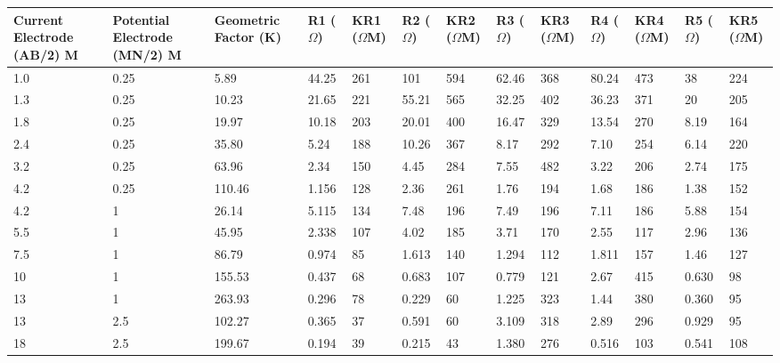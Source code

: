 \documentclass[12pt,a4paper]{report}
\begin{document}
\begin{table}[h!]
    \centering
    \begin{adjustbox}{max width=\textwidth}
    \renewcommand{\arraystretch}{1.5}
    \begin{tabular}{|p{2.5cm}|p{2.5cm}|p{2.5cm}|p{1.5cm}|p{1.8cm}|p{1.5cm}|p{1.8cm}|p{1.5cm}|p{1.8cm}|p{1.5cm}|p{1.8cm}|p{1.5cm}|p{1.8cm}|}
    \hline
    \textbf{Current Electrode (AB/2) M} & 
    \textbf{Potential Electrode (MN/2) M} & 
    \textbf{Geometric Factor (K)} & 
    \textbf{R1 ($\Omega$)} & 
    \textbf{KR1 ($\Omega$M)} & 
    \textbf{R2 ($\Omega$)} & 
    \textbf{KR2 ($\Omega$M)} & 
    \textbf{R3 ($\Omega$)} & 
    \textbf{KR3 ($\Omega$M)} & 
    \textbf{R4 ($\Omega$)} & 
    \textbf{KR4 ($\Omega$M)} & 
    \textbf{R5 ($\Omega$)} & 
    \textbf{KR5 ($\Omega$M)} \\ 
    \hline
    1.0 & 0.25 & 5.89 & 44.25 & 261 & 101 & 594 & 62.46 & 368 & 80.24 & 473 & 38 & 224 \\ \hline
    1.3 & 0.25 & 10.23 & 21.65 & 221 & 55.21 & 565 & 32.25 & 402 & 36.23 & 371 & 20 & 205 \\ \hline
    1.8 & 0.25 & 19.97 & 10.18 & 203 & 20.01 & 400 & 16.47 & 329 & 13.54 & 270 & 8.19 & 164 \\ \hline
    2.4 & 0.25 & 35.80 & 5.24 & 188 & 10.26 & 367 & 8.17 & 292 & 7.10 & 254 & 6.14 & 220 \\ \hline
    3.2 & 0.25 & 63.96 & 2.34 & 150 & 4.45 & 284 & 7.55 & 482 & 3.22 & 206 & 2.74 & 175 \\ \hline
    4.2 & 0.25 & 110.46 & 1.156 & 128 & 2.36 & 261 & 1.76 & 194 & 1.68 & 186 & 1.38 & 152 \\ \hline
    4.2 & 1 & 26.14 & 5.115 & 134 & 7.48 & 196 & 7.49 & 196 & 7.11 & 186 & 5.88 & 154 \\ \hline
    5.5 & 1 & 45.95 & 2.338 & 107 & 4.02 & 185 & 3.71 & 170 & 2.55 & 117 & 2.96 & 136 \\ \hline
    7.5 & 1 & 86.79 & 0.974 & 85 & 1.613 & 140 & 1.294 & 112 & 1.811 & 157 & 1.46 & 127 \\ \hline
    10 & 1 & 155.53 & 0.437 & 68 & 0.683 & 107 & 0.779 & 121 & 2.67 & 415 & 0.630 & 98 \\ \hline
    13 & 1 & 263.93 & 0.296 & 78 & 0.229 & 60 & 1.225 & 323 & 1.44 & 380 & 0.360 & 95 \\ \hline
    13 & 2.5 & 102.27 & 0.365 & 37 & 0.591 & 60 & 3.109 & 318 & 2.89 & 296 & 0.929 & 95 \\ \hline
    18 & 2.5 & 199.67 & 0.194 & 39 & 0.215 & 43 & 1.380 & 276 & 0.516 & 103 & 0.541 & 108 \\ \hline

\end{tabular}
\end{adjustbox}
\end{table}
\end{document}
